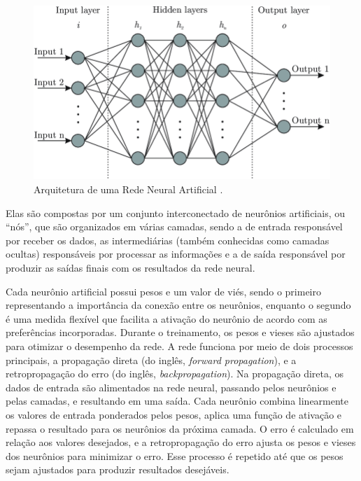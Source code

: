 \begin{figure}[!htbp]
	\centering
	\includegraphics[scale=0.4]{imagens/arch-rede-neural-artificial.png}
    \caption {Arquitetura de uma Rede Neural Artificial \cite{RedeNeuralImagem}.}
\end{figure}

Elas são compostas por um conjunto interconectado de neurônios artificiais, ou ``nós'', que são organizados em várias camadas, sendo a de entrada responsável por receber os dados, as intermediárias (também conhecidas como camadas ocultas) responsáveis por processar as informações e a de saída responsável por produzir as saídas finais com os resultados da rede neural.

Cada neurônio artificial possui pesos e um valor de viés, sendo o primeiro representando a importância da conexão entre os neurônios, enquanto o segundo é uma medida flexível que facilita a ativação do neurônio de acordo com as preferências incorporadas. Durante o treinamento, os pesos e vieses são ajustados para otimizar o desempenho da rede. A rede funciona por meio de dois processos principais, a propagação direta (do inglês, \textit{forward propagation}), e a retropropagação do erro (do inglês, \textit{backpropagation}). Na propagação direta, os dados de entrada são alimentados na rede neural, passando pelos neurônios e pelas camadas, e resultando em uma saída. Cada neurônio combina linearmente os valores de entrada ponderados pelos pesos, aplica uma função de ativação e repassa o resultado para os neurônios da próxima camada. O erro é calculado em relação aos valores desejados, e a retropropagação do erro ajusta os pesos e vieses dos neurônios para minimizar o erro. Esse processo é repetido até que os pesos sejam ajustados para produzir resultados desejáveis.

